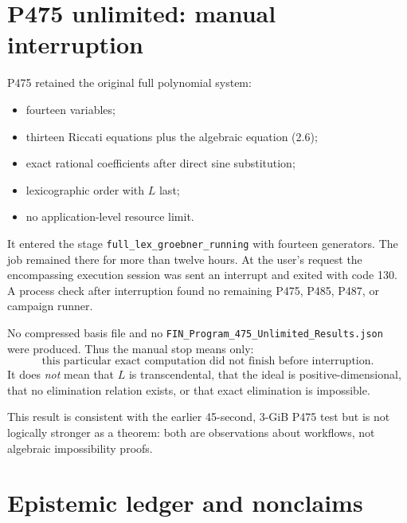 \documentclass[11pt,a4paper,openany]{report}
\begin{document}
\chapter{P475 unlimited: manual interruption}

P475 retained the original full polynomial system:
\begin{itemize}
\item fourteen variables;
\item thirteen Riccati equations plus the algebraic equation (2.6);
\item exact rational coefficients after direct sine substitution;
\item lexicographic order with \(L\) last;
\item no application-level resource limit.
\end{itemize}

It entered the stage \texttt{full\_lex\_groebner\_running} with fourteen
generators. The job remained there for more than twelve hours. At the user's
request the encompassing execution session was sent an interrupt and exited
with code 130. A process check after interruption found no remaining P475,
P485, P487, or campaign runner.

No compressed basis file and no
\texttt{FIN\_Program\_475\_Unlimited\_Results.json} were produced. Thus the
manual stop means only:
\[
 \text{this particular exact computation did not finish before interruption.}
\]
It does \emph{not} mean that \(L\) is transcendental, that the ideal is
positive-dimensional, that no elimination relation exists, or that exact
elimination is impossible.

This result is consistent with the earlier 45-second, 3-GiB P475 test but is
not logically stronger as a theorem: both are observations about workflows,
not algebraic impossibility proofs.

\chapter{Epistemic ledger and nonclaims}
\end{document}
